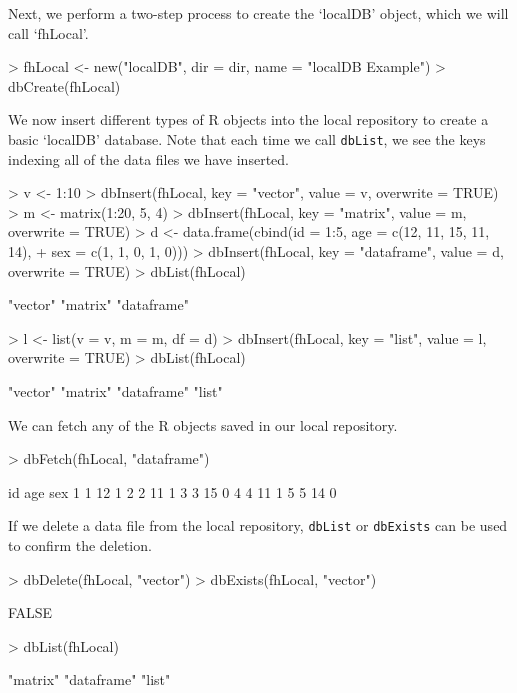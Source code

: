 \documentclass{article}
\newcommand{\code}{\texttt}
\begin{document}
\noindent Next, we perform a two-step process to create the `localDB' object, 
which we will call `fhLocal'.
\begin{Schunk}
\begin{Sinput}
> fhLocal <- new("localDB", dir = dir, name = "localDB Example")
> dbCreate(fhLocal)
\end{Sinput}
\end{Schunk}

\noindent We now insert different types of R objects into the local repository to 
create a basic `localDB' database. Note that each time we call 
\code{dbList}, we see the keys indexing all of the data files we have inserted.

\begin{Schunk}
\begin{Sinput}
> v <- 1:10
> dbInsert(fhLocal, key = "vector", value = v, overwrite = TRUE)
> m <- matrix(1:20, 5, 4)
> dbInsert(fhLocal, key = "matrix", value = m, overwrite = TRUE)
> d <- data.frame(cbind(id = 1:5, age = c(12, 11, 15, 11, 14), 
+     sex = c(1, 1, 0, 1, 0)))
> dbInsert(fhLocal, key = "dataframe", value = d, overwrite = TRUE)
> dbList(fhLocal)
\end{Sinput}
\begin{Soutput}
[1] "vector"    "matrix"    "dataframe"
\end{Soutput}
\begin{Sinput}
> l <- list(v = v, m = m, df = d)
> dbInsert(fhLocal, key = "list", value = l, overwrite = TRUE)
> dbList(fhLocal)
\end{Sinput}
\begin{Soutput}
[1] "vector"    "matrix"    "dataframe" "list"     
\end{Soutput}
\end{Schunk}

\noindent We can fetch any of the R objects saved in our local repository.
\begin{Schunk}
\begin{Sinput}
> dbFetch(fhLocal, "dataframe")
\end{Sinput}
\begin{Soutput}
  id age sex
1  1  12   1
2  2  11   1
3  3  15   0
4  4  11   1
5  5  14   0
\end{Soutput}
\end{Schunk}

\noindent If we delete a data file from the local repository, \code{dbList} or
\code{dbExists} can be used to confirm the deletion.
\begin{Schunk}
\begin{Sinput}
> dbDelete(fhLocal, "vector")
> dbExists(fhLocal, "vector")
\end{Sinput}
\begin{Soutput}
[1] FALSE
\end{Soutput}
\begin{Sinput}
> dbList(fhLocal)
\end{Sinput}
\begin{Soutput}
[1] "matrix"    "dataframe" "list"     
\end{Soutput}
\end{Schunk}
\end{document}
